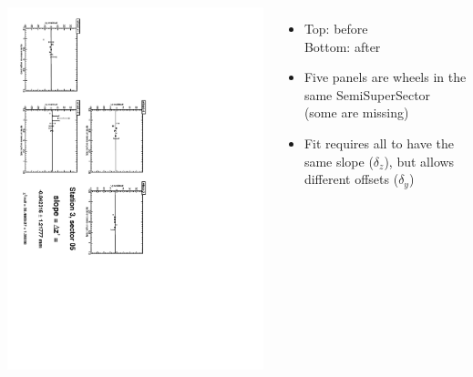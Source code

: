 \documentclass[compress]{beamer}
\begin{document}
\begin{frame}
\begin{columns}
\vfill
\includegraphics[height=\linewidth, angle=90]{zfits_after/zfit_3_05.pdf}
\begin{itemize}
\item Top: before \\ Bottom: after
\item Five panels are wheels in the same SemiSuperSector (some are missing)
\item Fit requires all to have the same slope ($\delta_z$), but allows different offsets ($\delta_y$)
\end{itemize}
\end{columns}
\end{frame}
\end{document}

